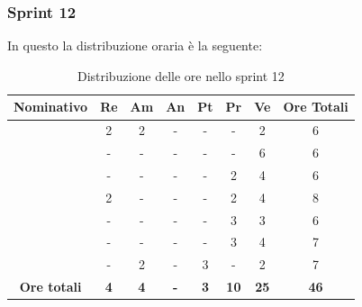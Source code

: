 \subsubsection{Sprint 12}
In questo  la distribuzione oraria è la seguente:
\begin{table}[H]
		\begin{center}
			\setlength{\aboverulesep}{0pt}
			\setlength{\belowrulesep}{0pt}
			\setlength{\extrarowheight}{.75ex}
			\begin{tabular}{ c c c c c c c c }
				\rowcolor{AzzurroGruppo!30} 
				\textbf{Nominativo} & \textbf{Re} & \textbf{Am} & \textbf{An} & \textbf{Pt} & \textbf{Pr} & \textbf{Ve} & \textbf{Ore Totali}  \\
				\toprule
				\Davide    & 2 & 2 & - & - & - & 2 & 6 \\
				\Giosue    & - & - & - & - & - & 6 & 6 \\
				\Francesco & - & - & - & - & 2 & 4 & 6\\
				\Daniele   & 2 & - & - & - & 2 & 4 & 8\\
				\Lucrezia  & - & - & - & - & 3 & 3 & 6\\
				\Matteo    & - & - & - & - & 3 & 4 & 7\\
				\Tommaso   & - & 2 & - & 3 & - & 2 & 7\\
				 \textbf{Ore totali} & \textbf{4} & \textbf{4} & \textbf{-} & \textbf{3} & \textbf{10} & \textbf{25} & \textbf{46} \\
				\bottomrule
			\end{tabular}
			\caption{Distribuzione delle ore nello sprint 12}
		\end{center}
	\end{table}


